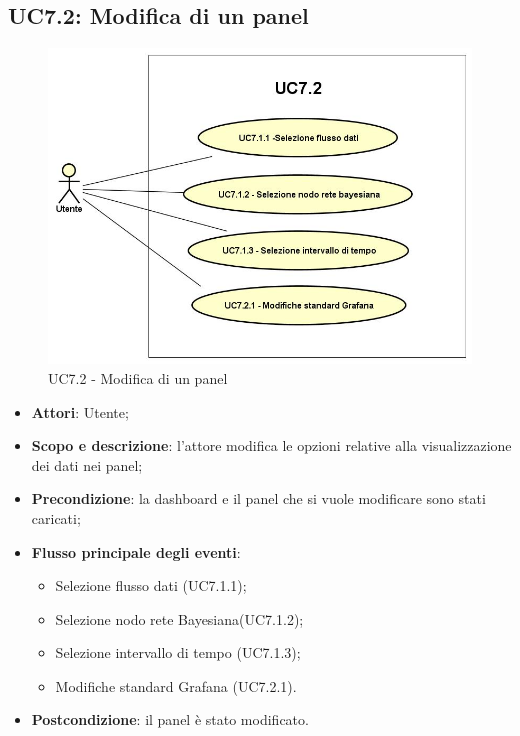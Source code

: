 \subsection{UC7.2: Modifica di un panel}
\hypertarget{UC7.2}{}
\begin{figure} [H]
	\centering
	\includegraphics[scale=0.45]{Img/UC7-2}
	\caption{UC7.2 - Modifica di un panel}\label{}
\end{figure}
\begin{itemize}
	\item \textbf{Attori}: Utente;
	\item \textbf{Scopo e descrizione}: l'attore modifica le opzioni relative alla visualizzazione dei dati nei panel;
	\item \textbf{Precondizione}: la dashboard e il panel che si vuole modificare sono stati caricati;
	\item \textbf{Flusso principale degli eventi}:
	\begin{itemize}
		\item Selezione flusso dati  (UC7.1.1);
		\item Selezione nodo rete Bayesiana(UC7.1.2);
		\item Selezione intervallo di tempo (UC7.1.3);
		\item Modifiche standard Grafana  (UC7.2.1).		
	\end{itemize}
	\item \textbf{Postcondizione}: il panel è stato modificato.
\end{itemize}
